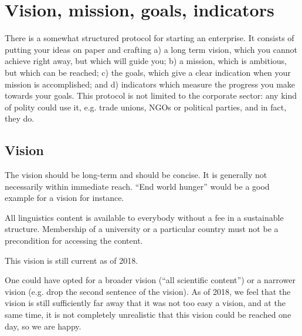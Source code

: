 \documentclass[nonflat,smallfont
]{langsci/langscibook}
\newcommand{\background}[1]{ 
  \vspace{5mm}
  \renewcommand{\tblslinecolour}{lsDarkBlue}
  \tblssy[red]{explore2}{Background}{\vspace*{-5mm}#1}
}
\newcommand{\langscisolution}[1]{
  \renewcommand{\tblslinecolour}{lsLightBlue}
  \tblssy{langsci}{LangSci solution}{\vspace*{-5mm}#1}
}
\newcommand{\evaluation}[1]{
  \renewcommand{\tblslinecolour}{lsLightOrange}
  \tblssy{receipt}{Evaluation}{\vspace*{-5mm}#1}
}
\newcommand{\othersolutions}[1]{
  \renewcommand{\tblslinecolour}{lsDarkGreenOne}
  \tblssy{more}{Other solutions}{\vspace*{-5mm}#1}
}
\renewcommand{\tblssy}[4][black!12]{%
  \renewcommand{\langscisymbol}{#2}\renewcommand{\tblsboxcolor}{#1}
  \begin{mdframed}[style=yellowexercise,frametitle={#3}]
    #4
  \end{mdframed}
}
\begin{document}
\section{Vision, mission, goals, indicators}
There is a somewhat structured protocol for starting an enterprise. It consists of putting your ideas on paper and crafting a) a long term vision, which you cannot achieve right away, but which will guide you;
b) a mission, which is ambitious, but which can be reached; 
c) the goals, which give a clear indication when your mission is accomplished; and
d) indicators which measure the progress you make towards your goals. 
This protocol is not limited to the corporate sector: any kind of polity could use it, e.g. trade unions, NGOs or political parties, and in fact, they do. 

\subsection{Vision}
\vspace*{5mm}\background{The vision should be long-term and should be concise. It is generally not necessarily within immediate reach. ``End world hunger'' would be a good example for a vision for instance.}
\langscisolution{
All linguistics content is available to everybody without a fee in a sustainable structure. Membership of a university or a particular country must not be a precondition for accessing the content.}
\evaluation{This vision is still current as of 2018.}
\othersolutions{One could have opted for a broader vision (``all scientific content'') or a narrower vision (e.g. drop the second sentence of the vision). As of 2018, we feel that the vision is still sufficiently far away that it was not too easy a vision, and at the same time, it is not completely unrealistic that this vision could be reached one day, so we are happy.} 
 
   
\end{document}
